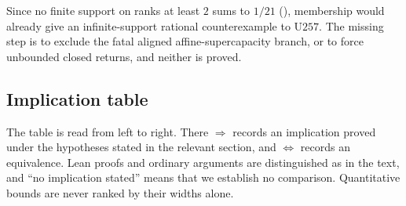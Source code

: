 Since no finite support on ranks at least $2$ sums to $1/21$
(),
membership would already give an infinite-support rational counterexample
to $\mathrm{U257}$.  The missing step is to exclude the fatal aligned
affine-supercapacity branch, or to force unbounded closed returns, and neither is
proved.

\subsection{Implication table}
\label{sec:v-table}

The table is read from left to right. There $\Rightarrow$ records an implication
proved under the hypotheses stated in the relevant section, and
$\Leftrightarrow$ records an equivalence.  Lean proofs and ordinary
arguments are distinguished as in the text, and ``no implication stated'' means that
we establish no comparison.  Quantitative bounds are never ranked
by their widths alone.

